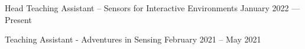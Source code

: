 Head Teaching Assistant – Sensors for Interactive Environments \hfill January 2022 --- Present

Teaching Assistant - Adventures in Sensing	\hfill February 2021 – May 2021
